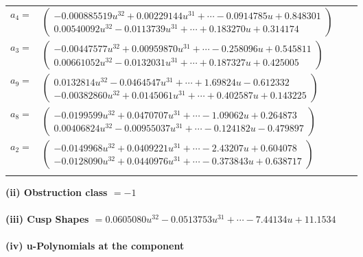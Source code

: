 \documentclass[1p]{elsarticle_modified}
\theoremstyle{definition}
\begin{document}
\begin{tabular}{m{7pt} m{180pt} m{7pt} m{180pt} }
\flushright $a_{4}=$&$\begin{pmatrix}-0.000885519 u^{32}+0.00229144 u^{31}+\cdots-0.0914785 u+0.848301\\0.00540092 u^{32}-0.0113739 u^{31}+\cdots+0.183270 u+0.314174\end{pmatrix}$ \\
\flushright $a_{3}=$&$\begin{pmatrix}-0.00447577 u^{32}+0.00959870 u^{31}+\cdots-0.258096 u+0.545811\\0.00661052 u^{32}-0.0132031 u^{31}+\cdots+0.187327 u+0.425005\end{pmatrix}$ \\
\flushright $a_{9}=$&$\begin{pmatrix}0.0132814 u^{32}-0.0464547 u^{31}+\cdots+1.69824 u-0.612332\\-0.00382860 u^{32}+0.0145061 u^{31}+\cdots+0.402587 u+0.143225\end{pmatrix}$ \\
\flushright $a_{8}=$&$\begin{pmatrix}-0.0199599 u^{32}+0.0470707 u^{31}+\cdots-1.09062 u+0.264873\\0.00406824 u^{32}-0.00955037 u^{31}+\cdots-0.124182 u-0.479897\end{pmatrix}$ \\
\flushright $a_{2}=$&$\begin{pmatrix}-0.0149968 u^{32}+0.0409221 u^{31}+\cdots-2.43207 u+0.604078\\-0.0128090 u^{32}+0.0440976 u^{31}+\cdots-0.373843 u+0.638717\end{pmatrix}$\\&\end{tabular}
\flushleft \textbf{(ii) Obstruction class $= -1$}\\~\\
\flushleft \textbf{(iii) Cusp Shapes $= 0.0605080 u^{32}-0.0513753 u^{31}+\cdots-7.44134 u+11.1534$}\\~\\
\newpage\renewcommand{\arraystretch}{1}
\flushleft \textbf{(iv) u-Polynomials at the component}\newline \\
\end{document}
